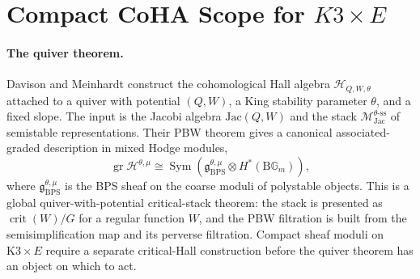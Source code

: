 %

\providecommand{\CoHA}{\mathcal{H}}
\providecommand{\gBPS}{\mathfrak{g}_{\mathrm{BPS}}}
\providecommand{\Mod}{\mathcal{M}}
\providecommand{\Jac}{\mathrm{Jac}}
\providecommand{\phW}{\varphi_W}
\providecommand{\K}{\mathrm{K}3}
\providecommand{\cO}{\mathcal{O}}
\providecommand{\Db}{D^b}
\providecommand{\Coh}{\operatorname{Coh}}
\providecommand{\kcat}{\kappa_{\mathrm{cat}}}
\providecommand{\kch}{\kappa_{\mathrm{ch}}}
\providecommand{\kBKM}{\kappa_{\mathrm{BKM}}}
\providecommand{\kfib}{\kappa_{\mathrm{fiber}}}
\providecommand{\fg}{\mathfrak{g}}
\providecommand{\cD}{\mathcal{D}}
\providecommand{\Rep}{\operatorname{Rep}}
\providecommand{\cZ}{\mathcal{Z}}

\section*{Compact CoHA Scope for $K3\times E$}

\paragraph{The quiver theorem.}
Davison and Meinhardt construct the cohomological Hall algebra
$\CoHA_{Q,W,\theta}$ attached to a quiver with potential $(Q,W)$, a
King stability parameter $\theta$, and a fixed slope. The input is the
Jacobi algebra $\Jac(Q,W)$ and the stack
$\Mod^{\theta\text{-ss}}_{\Jac}$ of semistable representations. Their
PBW theorem gives a canonical associated-graded description in mixed
Hodge modules,
\[
\operatorname{gr}\CoHA^{\theta,\mu}
  \cong
  \operatorname{Sym}\!\left(
    \gBPS^{\theta,\mu}\otimes H^*(\mathrm{B}\mathbb{G}_m)
  \right),
\]
where $\gBPS^{\theta,\mu}$ is the BPS sheaf on the coarse moduli of
polystable objects. This is a global quiver-with-potential critical-stack
theorem: the stack is presented as $\operatorname{crit}(W)/G$ for a
regular function $W$, and the PBW filtration is built from the
semisimplification map and its perverse filtration. Compact sheaf moduli
on $\K\times E$ require a separate critical-Hall construction before the
quiver theorem has an object on which to act.

